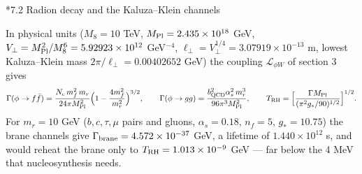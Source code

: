 \documentclass[10pt,a4paper]{article}
\makeatletter
\renewcommand\subsection{\@startsection{subsection}{2}{\z@}{-3.25ex\@plus -1ex \@minus -.2ex}{1.5ex \@plus .2ex}{\normalfont\large\bfseries\raggedright}}
\makeatother
\begin{document}
\subsection*{7.2 Radion decay and the Kaluza–Klein channels}
In physical units ($M_8=10$ TeV, $M_{\rm Pl}=2.435\times10^{18}$ GeV, $V_\perp=M_{\rm Pl}^2/M_8^6=5.92923\times10^{12}$ GeV$^{-4}$, $\ell_\perp=V_\perp^{1/4}=3.07919\times10^{-13}$ m, lowest Kaluza–Klein mass $2\pi/\ell_\perp=0.00402652$ GeV) the coupling $\mathcal L_{\phi W}$ of section 3 gives
\begin{equation*}
\Gamma(\phi\to f\bar f)=\frac{N_c\,m_f^2\,m_r}{24\pi M_{\rm Pl}^2}\Big(1-\frac{4m_f^2}{m_r^2}\Big)^{3/2},\qquad \Gamma(\phi\to gg)=\frac{b_{\rm QCD}^2\alpha_s^2\,m_r^3}{96\pi^3M_{\rm Pl}^2},\qquad T_{\rm RH}=\Big[\frac{\Gamma M_{\rm Pl}}{(\pi^2g_*/90)^{1/2}}\Big]^{1/2}.
\end{equation*}
For $m_r=10$ GeV ($b,c,\tau,\mu$ pairs and gluons, $\alpha_s=0.18$, $n_f=5$, $g_*=10.75$) the brane channels give $\Gamma_{\rm brane}=4.572\times10^{-37}$ GeV, a lifetime of $1.440\times10^{12}$ s, and would reheat the brane only to $T_{\rm RH}=1.013\times10^{-9}$ GeV — far below the 4 MeV that nucleosynthesis needs.
\end{document}
